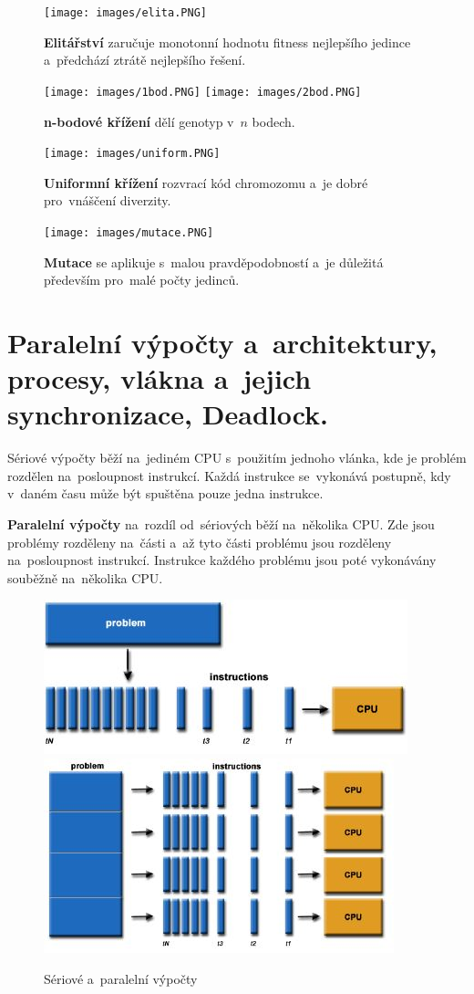 \begin{figure}[ht]
	\centering
	\texttt{[image: images/elita.PNG]}
	\caption{\textbf{Elitářství} zaručuje monotonní hodnotu fitness nejlepšího jedince a~předchází ztrátě nejlepšího řešení.}

	\texttt{[image: images/1bod.PNG]}
	\texttt{[image: images/2bod.PNG]}
	\caption{\textbf{n-bodové křížení} dělí genotyp v~$n$ bodech.}

	\texttt{[image: images/uniform.PNG]}
	\caption{\textbf{Uniformní křížení} rozvrací kód chromozomu a~je dobré pro~vnáščení diverzity.}

	\texttt{[image: images/mutace.PNG]}
	\caption{\textbf{Mutace} se aplikuje s~malou pravděpodobností a~je důležitá především pro~malé počty jedinců.}
\end{figure}

\section{Paralelní výpočty a~architektury, procesy, vlákna a~jejich synchronizace, Deadlock.}

Sériové výpočty běží na~jediném CPU s~použitím jednoho vlánka, kde je problém rozdělen na~posloupnost instrukcí. Každá instrukce se~vykonává postupně, kdy v~daném času může být spuštěna pouze jedna instrukce.

\textbf{Paralelní výpočty} na~rozdíl od~sériových běží na~několika CPU. Zde jsou problémy rozděleny na~části a~až tyto části problému jsou rozděleny na~posloupnost instrukcí. Instrukce každého problému jsou poté vykonávány souběžně na~několika CPU.

\begin{figure}[ht]
	\centering
	\includegraphics[scale=0.7]{images/serialComputing.JPG}
	\hspace*{1em}
	\includegraphics[scale=0.7]{images/parallelComputing.JPG}
	
	\caption{Sériové a~paralelní výpočty}
\end{figure}

